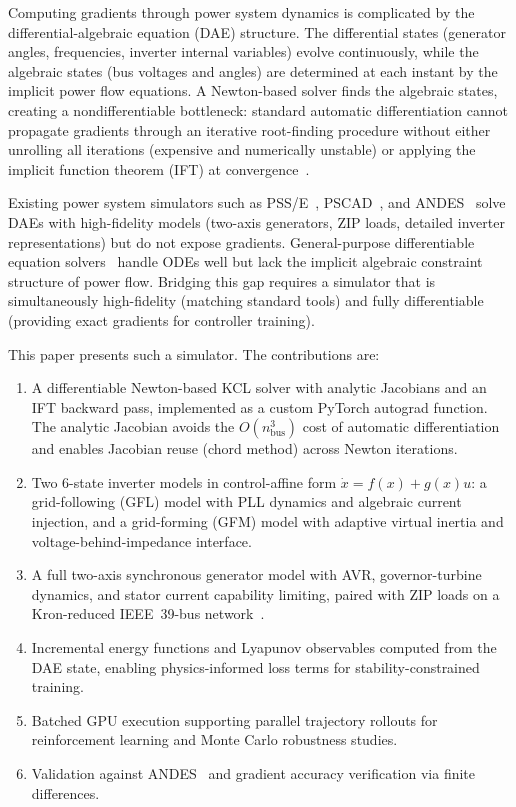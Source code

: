 \documentclass[11pt]{article}
\begin{document}
Computing gradients through power system dynamics is complicated by the
differential-algebraic equation (DAE) structure.  The differential
states (generator angles, frequencies, inverter internal variables)
evolve continuously, while the algebraic states (bus voltages and
angles) are determined at each instant by the implicit power flow
equations.  A Newton-based solver finds the algebraic states, creating
a nondifferentiable bottleneck: standard automatic differentiation
cannot propagate gradients through an iterative root-finding procedure
without either unrolling all iterations (expensive and numerically
unstable) or applying the implicit function theorem (IFT) at
convergence~\cite{Blondel22EfficientIFT}.

Existing power system simulators such as
PSS/E~\cite{PSSE}, PSCAD~\cite{PSCAD}, and
ANDES~\cite{Cui21ANDES} solve DAEs with high-fidelity models
(two-axis generators, ZIP loads, detailed inverter representations) but
do not expose gradients.  General-purpose differentiable equation
solvers~\cite{Chen18NeuralODE} handle ODEs well but lack the implicit
algebraic constraint structure of power flow.  Bridging this gap
requires a simulator that is simultaneously high-fidelity (matching
standard tools) and fully differentiable (providing exact gradients for
controller training).

This paper presents such a simulator.  The contributions are:
\begin{enumerate}
\item A differentiable Newton-based KCL solver with analytic Jacobians
  and an IFT backward pass, implemented as a custom PyTorch autograd
  function.  The analytic Jacobian avoids the $O(n_{\mathrm{bus}}^3)$
  cost of automatic differentiation and enables Jacobian reuse (chord
  method) across Newton iterations.
\item Two 6-state inverter models in control-affine form
  $\dot{x} = f(x) + g(x)u$: a grid-following (GFL) model with PLL
  dynamics and algebraic current injection, and a grid-forming (GFM)
  model with adaptive virtual inertia and voltage-behind-impedance
  interface.
\item A full two-axis synchronous generator model with AVR,
  governor-turbine dynamics, and stator current capability limiting,
  paired with ZIP loads on a Kron-reduced IEEE~39-bus
  network~\cite{Athay79IEEE39Bus}.
\item Incremental energy functions and Lyapunov observables computed
  from the DAE state, enabling physics-informed loss terms for
  stability-constrained training.
\item Batched GPU execution supporting parallel trajectory rollouts for
  reinforcement learning and Monte Carlo robustness studies.
\item Validation against ANDES~\cite{Cui21ANDES} and gradient accuracy
  verification via finite differences.
\end{enumerate}
\end{document}
